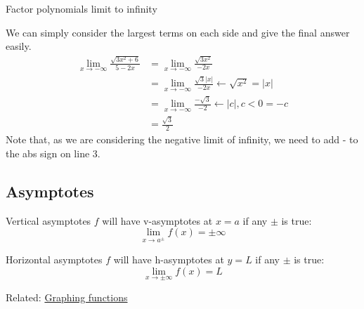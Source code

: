 \begin{example}
    Factor polynomials limit to infinity

    We can simply consider the largest terms on each side and give the final answer easily.
    \begin{align*}
        \lim_{x \to -\infty } \frac{{\sqrt {3{x^2} + 6} }}{{5 - 2x}} & =\lim_{x \to -\infty }\frac{\sqrt{3x^2}}{-2x}                           \\
                                                                     & =\lim_{x \to -\infty }\frac{\sqrt{3}|x|}{-2x} \leftarrow \sqrt{x^2}=|x| \\
                                                                     & =\lim_{x \to -\infty }\frac{-\sqrt{3}}{-2} \leftarrow |c|,c<0=-c        \\
                                                                     & =\frac{\sqrt{3}}{2}
    \end{align*}
    Note that, as we are considering the negative limit of infinity, we need to add - to the abs sign on line 3.
\end{example}

\label{sec:asymptotes}
\subsection{Asymptotes}
\begin{definition}
    {Vertical asymptotes}
    $f$ will have v-asymptotes at $x=a$ if any $\pm$ is true:
    \[\lim_{x\to a^\pm}f(x)=\pm\infty\]
\end{definition}
\begin{definition}
    {Horizontal asymptotes}
    $f$ will have h-asymptotes at $y=L$ if any $\pm$ is true:
    \[\lim_{x\to\pm\infty}f(x)=L\]
\end{definition}
Related: \hyperref[sec:graph]{Graphing functions}